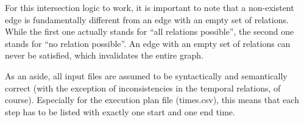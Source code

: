     For this
    intersection logic to work, it is important to note that a non-existent edge
    is fundamentally different from an edge with an empty set of relations.
    While the first one actually stands for ``all relations possible'', the
    second one stands for ``no relation possible''. An edge with an empty set of
    relations can never be satisfied, which invalidates the entire graph.

    As an aside, all input files are assumed to be syntactically and
    semantically correct (with the exception of inconsistencies in the temporal
    relations, of course). Especially for the execution plan file (times.csv),
    this means that each step has to be listed with exactly one start and one end time.